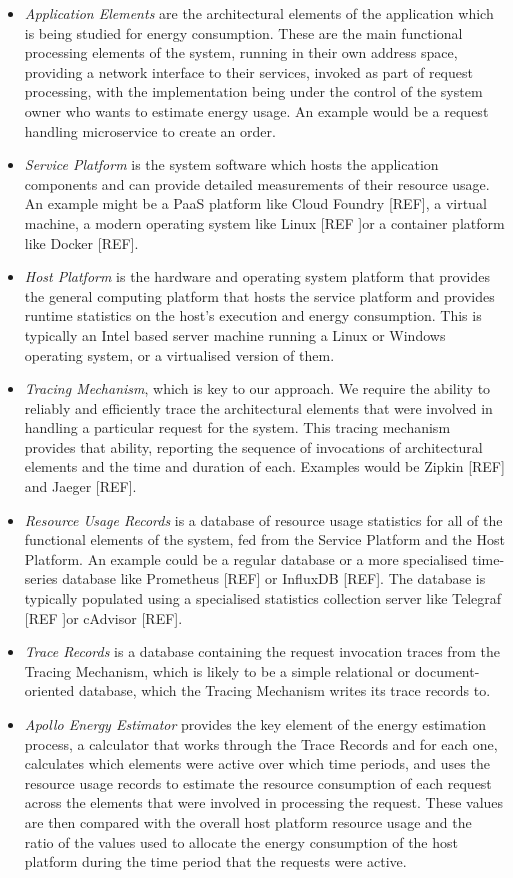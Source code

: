 \begin{itemize}
\item \emph{Application Elements} are the architectural elements of the application which is being studied for energy consumption.  These are the main functional processing elements of the system, running in their own address space, providing a network interface to their services, invoked as part of request processing, with the implementation being under the control of the system owner who wants to estimate energy usage.  An example would be a request handling microservice to create an order.
\item \emph{Service Platform} is the system software which hosts the application components and can provide detailed measurements of their resource usage.  An example might be a PaaS platform like Cloud Foundry [REF], a virtual machine, a modern operating system like Linux [REF ]or a container platform like Docker [REF].
\item \emph{Host Platform} is the hardware and operating system platform that provides the general computing platform that hosts the service platform and provides runtime statistics on the host's execution and energy consumption.  This is typically an Intel based server machine running a Linux or Windows operating system, or a virtualised version of them.
\item \emph{Tracing Mechanism}, which is key to our approach.  We require the ability to reliably and efficiently trace the architectural elements that were involved in handling a particular request for the system.  This tracing mechanism provides that ability, reporting the sequence of invocations of architectural elements and the time and duration of each.  Examples would be Zipkin [REF] and Jaeger [REF].
\item \emph{Resource Usage Records} is a database of resource usage statistics for all of the functional elements of the system, fed from the Service Platform and the Host Platform.  An example could be a regular database or a more specialised time-series database like Prometheus [REF] or InfluxDB [REF].  The database is typically populated using a specialised statistics collection server like Telegraf [REF ]or cAdvisor [REF].
\item \emph{Trace Records} is a database containing the request invocation traces from the Tracing Mechanism, which is likely to be a simple relational or document-oriented database, which the Tracing Mechanism writes its trace records to.
\item \emph{Apollo Energy Estimator} provides the key element of the energy estimation process, a calculator that works through the Trace Records and for each one, calculates which elements were active over which time periods, and uses the resource usage records to estimate the resource consumption of each request across the elements that were involved in processing the request.  These values are then compared with the overall host platform resource usage and the ratio of the values used to allocate the energy consumption of the host platform during the time period that the requests were active.

\end{itemize}

